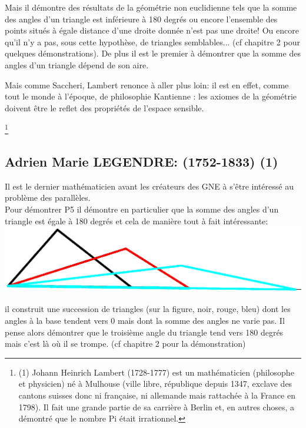 \documentclass[a4paper, 12pt, twoside]{book}
\begin{document}
  
    Mais il démontre des résultats de la géométrie  non euclidienne tels que la somme des angles d'un triangle est inférieure à 180 degrés ou encore l'ensemble des points situés   à égale distance  d'une droite donnée n'est pas une droite! Ou encore qu'il n'y a pas, sous cette hypothèse, de triangles semblables... (cf chapitre 2 pour quelques démonstrations). De plus il est le premier à démontrer que la somme des angles d'un triangle dépend de son aire.\bigskip 
   
   
    
    Mais comme Saccheri, Lambert renonce à aller plus loin: il est en effet, comme tout le monde à l’époque, de philosophie Kantienne : les axiomes de la géométrie doivent être le reflet des propriétés de l’espace sensible. 
    
    
  \footnote{(1) Johann Heinrich Lambert (1728-1777) est un mathématicien (philosophe et physicien) né à Mulhouse (ville libre, république depuis 1347, exclave des cantons suisses donc ni française, ni allemande mais rattachée à la France en 1798).
   Il fait une grande partie de sa carrière à Berlin et, en autres choses, a démontré que le nombre Pi était irrationnel. } 
  

\newpage \subsection{Adrien Marie LEGENDRE: (1752-1833) (1)}

Il est le dernier mathématicien avant les créateurs des GNE à s'être intéressé au problème des parallèles.\\
 
   Pour démontrer P5 il démontre en particulier que la somme des angles d'un triangle est égale à 180 degrés et cela de manière tout à fait intéressante:\\
   
   
   \includegraphics[scale=1]{figures/Leg1.eps} 
   
   
    il construit une succession de triangles (sur la figure, noir, rouge, bleu) dont les angles à la base tendent vers 0 mais dont la somme des angles ne varie pas. Il pense alors démontrer que le troisième angle du triangle tend vers 180 degrés mais c'est là où il se trompe. (cf chapitre 2 pour la démonstration)\bigskip
 
\end{document}
